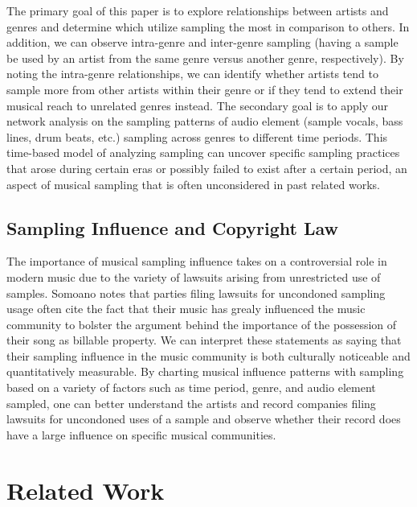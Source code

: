 \documentclass[pageno]{jpaper}
\begin{document}
The primary goal of this paper is to explore relationships between artists and genres and determine which utilize sampling the most in comparison to others. In addition, we can observe intra-genre and inter-genre sampling (having a sample be used by an artist from the same genre versus another genre, respectively). By noting the intra-genre relationships, we can identify whether artists tend to sample more from other artists within their genre or if they tend to extend their musical reach to unrelated genres instead. 
The secondary goal is to apply our network analysis on the sampling patterns of audio element (sample vocals, bass lines, drum beats, etc.) sampling across genres to different time periods. This time-based model of analyzing sampling can uncover specific sampling practices that arose during certain eras or possibly failed to exist after a certain period, an aspect of musical sampling that is often unconsidered in past related works.
\subsection{Sampling Influence and Copyright Law}
The importance of musical sampling influence takes on a controversial role in modern music due to the variety of lawsuits arising from unrestricted use of samples. Somoano notes that  parties filing lawsuits for uncondoned sampling usage often cite the fact that their music has grealy influenced the music community to bolster the argument behind the importance of the possession of their song as billable property. \cite{Somoano} We can interpret these statements as saying that their sampling influence in the music community is both culturally noticeable and quantitatively measurable. By charting musical influence patterns with sampling based on a variety of factors such as time period, genre, and audio element sampled, one can better understand the artists and record companies filing lawsuits for uncondoned uses of a sample and observe whether their record does have a large influence on specific musical communities. 
\section{Related Work}
\end{document}
